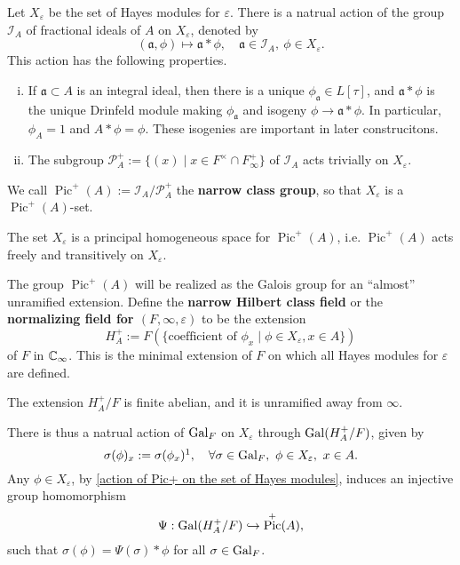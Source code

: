 \documentclass{article}
\DeclareMathOperator{\pic}{Pic}
\begin{document}
Let $X_\varepsilon$ be the set of Hayes modules for $\varepsilon$.
There is a natrual action of the group $\mathcal{I}_A$ of fractional ideals of $A$ on $X_\varepsilon$, denoted by \[(\mathfrak{a}, \phi)\mapsto\mathfrak{a} * \phi, \quad \mathfrak{a}\in\mathcal{I}_A,\ \phi\in X_\varepsilon.\]
This action has the following properties.
\begin{enumerate}[(i)]
    \item If $\mathfrak{a}\subset A$ is an integral ideal, then there is a unique $\phi_\mathfrak{a}\in L[\tau]$, and $\mathfrak{a} * \phi$ is the unique Drinfeld module making $\phi_\mathfrak{a}$ and isogeny $\phi\to\mathfrak{a} * \phi$. 
    In particular, $\phi_A = 1$ and $A*\phi = \phi$.
    These isogenies are important in later construcitons.
    \item The subgroup $\mathcal{P}_A^+ := \{(x)\mid x\in F^\times\cap F_\infty^+\}$ of $\mathcal{I}_A$
    acts trivially on $X_\varepsilon$.
\end{enumerate}
We call $\pic^+(A) := \mathcal{I}_A/\mathcal{P}^+_A$ the \textbf{narrow class group}, so that $X_\varepsilon$ is a $\pic^+(A)$-set.
\begin{proposition}\label{action of Pic+ on the set of Hayes modules}
    The set $X_\varepsilon$ is a principal homogeneous space for $\pic^+(A)$, i.e. $\pic^+(A)$ acts freely and transitively on $X_\varepsilon$.
\end{proposition}
The group $\pic^+(A)$ will be realized as the Galois group for an ``almost'' unramified extension.
Define the \textbf{narrow Hilbert class field} or the \textbf{normalizing field for $(F, \infty, \varepsilon)$} to be the extension \[H_A^+ := F\left( \{\text{coefficient of }\phi_x\mid \phi\in X_\varepsilon, x\in A\} \right)\]
of $F$ in $\mathbb{C}_\infty$. This is the minimal extension of $F$ on which all Hayes modules for $\varepsilon$ are defined.
\begin{proposition}\label{narrow Hilbert class field is unramified outside infty}
    The extension $H_A^+/F$ is finite abelian, and it is unramified away from $\infty$.
\end{proposition}
There is thus a natrual action of $\operatorname{Gal}_F$ on $X_\varepsilon$ through $\operatorname{Gal}(H_A^+/F)$, given by \[\sigma(\phi)_x := \sigma(\phi_x)\footnotemark,\quad \forall\sigma\in\gal_F,\ \phi\in X_\varepsilon,\ x\in A.\]
Any $\phi\in X_\varepsilon$, by \cref{action of Pic+ on the set of Hayes modules}, induces an injective group homomorphism
\[\Psi : \gal(H_A^+/F)\inject \pic^+(A),\]
such that $\sigma(\phi) = \Psi(\sigma) * \phi$ for all $\sigma\in\operatorname{Gal}_F$.
\end{document}
